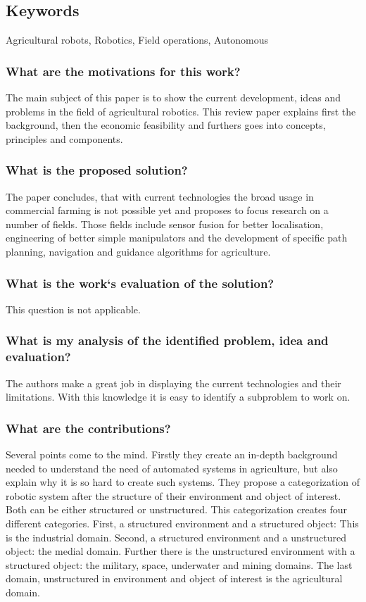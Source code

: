     
    \subsection*{Keywords}
    Agricultural robots, Robotics, Field operations, Autonomous
    
    
     
    
    \subsubsection*{What are the motivations for this work?}
    The main subject of this paper is to show the current development, ideas and problems in the field of agricultural 
    robotics. This review paper explains first the background, then the economic feasibility and furthers goes into 
    concepts, principles and components.
    \subsubsection*{What is the proposed solution?} 
    The paper concludes, that with current technologies the broad usage in commercial farming is not possible yet and 
    proposes to focus research on a number of fields. Those fields include sensor fusion for better localisation, 
    engineering of better simple manipulators and the development of specific path planning, navigation and guidance algorithms
    for agriculture.
    \subsubsection*{What is the work`s evaluation of the solution?}
    This question is not applicable.
    \subsubsection*{What is my analysis of the identified problem, idea and evaluation?}
    The authors make a great job in displaying the current technologies and their limitations. With this knowledge it is 
    easy to identify a subproblem to work on.
    \subsubsection*{What are the contributions?}
    Several points come to the mind. Firstly they create an in-depth background needed to understand the need of automated
    systems in agriculture, but also explain why it is so hard to create such systems. 
    They propose a categorization of robotic system after the structure of their environment and object of interest. Both 
    can be either structured or unstructured. This categorization creates four different categories. First, a structured 
    environment and a structured object: This is the industrial domain. Second, a structured environment and a unstructured
    object: the medial domain. Further there is the unstructured environment with a structured object: the military, space, underwater
    and mining domains. The last domain, unstructured in environment and object of interest is the agricultural domain.
    
